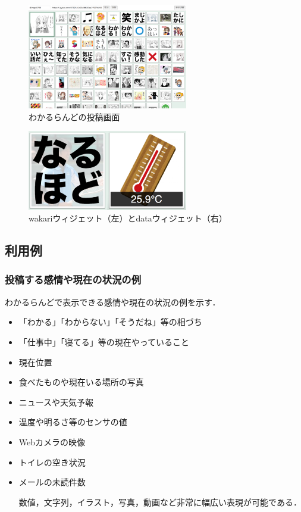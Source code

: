 \begin{figure}[h]
\centering
\includegraphics[width=7cm]{images/console.eps}
\caption{わかるらんどの投稿画面}
\label{console}
\end{figure}

\begin{figure}[h]
\centering
\includegraphics[width=7cm]{images/widget.eps}
\caption{wakariウィジェット（左）とdataウィジェット（右）}
\label{widget}
\end{figure}

\subsection{利用例}

\subsubsection{投稿する感情や現在の状況の例}

わかるらんどで表示できる感情や現在の状況の例を示す．

\begin{itemize}
\item 「わかる」「わからない」「そうだね」等の相づち
\item 「仕事中」「寝てる」等の現在やっていること
\item 現在位置
\item 食べたものや現在いる場所の写真
\item ニュースや天気予報
\item 温度や明るさ等のセンサの値
\item Webカメラの映像
\item トイレの空き状況
\item メールの未読件数

数値，文字列，イラスト，写真，動画など非常に幅広い表現が可能である．

\end{itemize}

